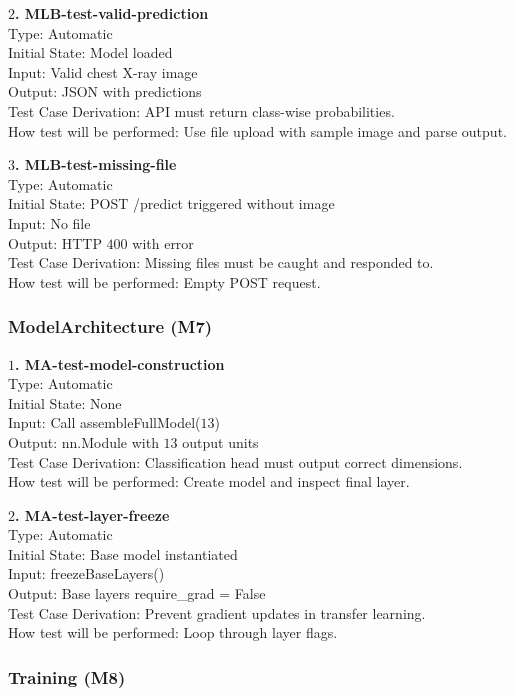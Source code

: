 \documentclass[12pt, titlepage]{article}
\begin{document}
\textbf{$2$. MLB-test-valid-prediction}\\
Type: Automatic\\
Initial State: Model loaded\\
Input: Valid chest X-ray image\\
Output: JSON with predictions\\
Test Case Derivation: API must return class-wise probabilities.\\
How test will be performed: Use file upload with sample image and parse output.

\textbf{$3$. MLB-test-missing-file}\\
Type: Automatic\\
Initial State: POST /predict triggered without image\\
Input: No file\\
Output: HTTP $400$ with error\\
Test Case Derivation: Missing files must be caught and responded to.\\
How test will be performed: Empty POST request.

\subsubsection{ModelArchitecture (M7)}

\textbf{$1$. MA-test-model-construction}\\
Type: Automatic\\
Initial State: None\\
Input: Call assembleFullModel($13$)\\
Output: nn.Module with $13$ output units\\
Test Case Derivation: Classification head must output correct dimensions.\\
How test will be performed: Create model and inspect final layer.

\textbf{$2$. MA-test-layer-freeze}\\
Type: Automatic\\
Initial State: Base model instantiated\\
Input: freezeBaseLayers()\\
Output: Base layers require\_grad = False\\
Test Case Derivation: Prevent gradient updates in transfer learning.\\
How test will be performed: Loop through layer flags.

\subsubsection{Training (M8)}
\end{document}
